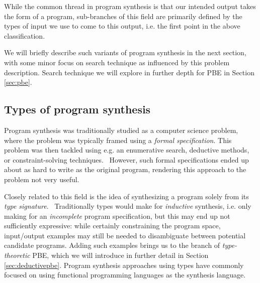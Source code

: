 \documentclass{article}
\begin{document}
While the common thread in program synthesis is that our intended output takes the form of a program,
sub-branches of this field are primarily defined by the types of input we use to come to this output,
i.e. the 
first point
in the above classification.

We will briefly describe such variants of program synthesis in the next section,
with some minor focus on search technique as influenced by this problem description.
Search technique we will explore in further depth for PBE in Section \ref{sec:pbe}.

\subsection{Types of program synthesis} \label{sec:synthtypes}


Program synthesis was traditionally studied as a computer science problem,
where the problem was typically framed using a \emph{formal specification}.
This problem was then tackled using e.g. an enumerative search, deductive methods, or constraint-solving techniques.~\citep{gulwani2017program}
However, such formal specifications ended up about as hard to write as the original program,
rendering this approach to the problem not very useful.

Closely related to this field is the idea of synthesizing a program solely from its \emph{type signature}.~\citep{djinn,synquid}
Traditionally types would make for \emph{inductive} synthesis,
i.e. only making for an \emph{incomplete} program specification,
but this may end up not sufficiently expressive:
while certainly constraining the program space,
input/output examples may still be needed to disambiguate between potential candidate programs.
Adding such examples brings us to the branch of \emph{type-theoretic} PBE,
which we will introduce in further detail in Section \ref{sec:deductivepbe}.
Program synthesis approaches using types have commonly focused on using functional programming languages as the synthesis language.%
~\citep{synquid,eguchi2018automated,scythe,scout,gissurarson2018suggesting,idris,lenses}
\end{document}
